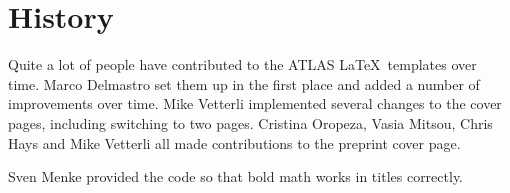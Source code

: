 \documentclass[atlasstyle,UKenglish]{latex/atlasdoc}
\begin{document}
\section*{History}

Quite a lot of people have contributed to the ATLAS \LaTeX\ templates over time.
Marco Delmastro set them up in the first place and added a number of improvements over time.
Mike Vetterli implemented several changes to the cover pages, including switching to two pages.
Cristina Oropeza, Vasia Mitsou, Chris Hays and Mike Vetterli all made contributions to the preprint cover page.

Sven Menke provided the code so that bold math works in titles correctly.

\printbibliography
\end{document}
